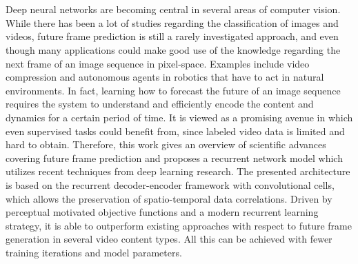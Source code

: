 \chapter{\abstractname}

Deep neural networks are becoming central in several areas of computer vision. While there has been a lot of studies regarding the classification of images and videos, future frame prediction is still a rarely investigated approach, and even though many applications could make good use of the knowledge regarding the next frame of an image sequence in pixel-space. Examples include video compression and autonomous agents in robotics that have to act in natural environments. In fact, learning how to forecast the future of an image sequence requires the system to understand and efficiently encode the content and dynamics for a certain period of time. It is viewed as a promising avenue in which even supervised tasks could benefit from, since labeled video data is limited and hard to obtain. Therefore, this work gives an overview of scientific advances covering future frame prediction and proposes a recurrent network model which utilizes recent techniques from deep learning research. The presented architecture is based on the recurrent decoder-encoder framework with convolutional cells, which allows the preservation of spatio-temporal data correlations. Driven by perceptual motivated objective functions and a modern recurrent learning strategy, it is able to outperform existing approaches with respect to future frame generation in several video content types. All this can be achieved with fewer training iterations and model parameters.



